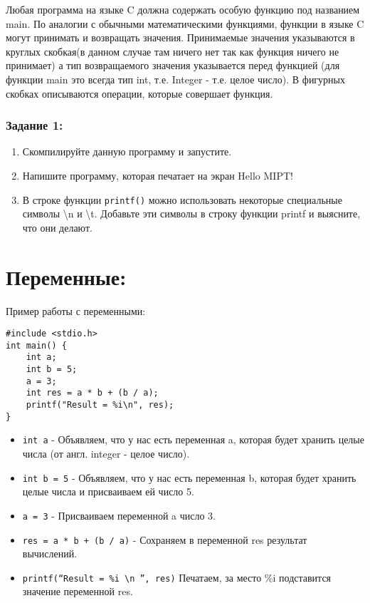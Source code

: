\documentclass{article}
\begin{document}
Любая программа на языке C должна содержать особую функцию под названием main. По аналогии с обычными математическими функциями, функции в языке C могут принимать и возвращать значения. Принимаемые значения указываются в круглых скобкая(в данном случае там ничего нет так как функция ничего не принимает) а тип возвращаемого значения указывается перед функцией (для функции main это всегда тип int, т.е. Integer - т.е. целое число). В фигурных скобках описываются операции, которые совершает функция. 
\subsubsection*{Задание 1:}
\begin{enumerate}
\item Скомпилируйте данную программу и запустите.
\item Напишите программу, которая печатает на экран Hello MIPT!
\item В строке функции \texttt{printf()} можно использовать некоторые специальные символы \textbackslash n и \textbackslash t. Добавьте эти символы в строку функции printf и выясните, что они делают.
\end{enumerate}

\section*{Переменные:}

Пример работы с переменными:
\begin{lstlisting}
#include <stdio.h>
int main() {
    int a;
    int b = 5;
    a = 3;
    int res = a * b + (b / a);
    printf("Result = %i\n", res);
}
\end{lstlisting}

\begin{itemize}
\item \texttt{int a} - Объявляем, что у нас есть переменная a, которая будет хранить целые числа (от англ. integer - целое число).
\item \texttt{int b = 5} - Объявляем, что у нас есть переменная b, которая будет хранить целые числа и присваиваем ей число 5.
\item \texttt{a = 3} - Присваиваем переменной a число 3.
\item \texttt{res = a * b + (b / a)} - Сохраняем в переменной res результат вычислений.
\item \texttt{printf(``Result = \%i \textbackslash n '', res)} Печатаем, за место \%i подставится значение переменной res.
\end{itemize}
\end{document}
